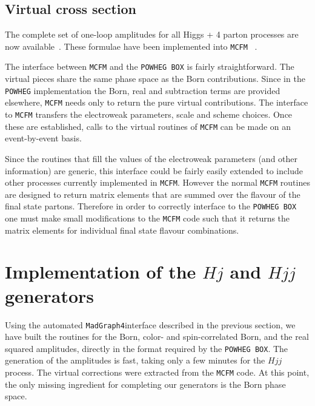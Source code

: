 \documentclass[paper]{JHEP3}
\newcommand\POWHEG{{\tt POWHEG}}
\newcommand\POWHEGBOX{{\tt POWHEG BOX}}
\newcommand\MG{{\tt MadGraph4}}
\newcommand\MCFM{{\tt MCFM}}
\begin{document}
\subsection{Virtual cross section}
The complete set of one-loop amplitudes for all Higgs + 4 parton processes
are now available~\cite{Berger:2006sh, Badger:2006us, Badger:2007si,Glover:2008ffa, Badger:2009hw, Dixon:2009uk, Badger:2009vh}. 
These formulae have been implemented into \MCFM{} ~\cite{Campbell:2010cz}. 
  
The interface between \MCFM{} and the \POWHEGBOX{} is fairly straightforward.
The virtual pieces share the same phase space as the Born
contributions. Since in the \POWHEG{} implementation the Born, real and
subtraction terms are provided elsewhere, \MCFM{} needs only to return the
pure virtual contributions.  The interface to \MCFM{} transfers the
electroweak parameters, scale and scheme choices.  Once these are
established, calls to the virtual routines of \MCFM{} can be made on an
event-by-event basis.
  
Since the routines that fill the values of the electroweak parameters (and
other information) are generic, this interface could be fairly easily
extended to include other processes currently implemented in \MCFM. However
the normal \MCFM{} routines are designed to return matrix elements that are
summed over the flavour of the final state partons. Therefore in order to
correctly interface to the \POWHEGBOX{} one must make small modifications to
the \MCFM{} code such that it returns the matrix elements for individual
final state flavour combinations.


\section{Implementation of the $Hj$ and $Hjj$ generators}
Using the automated \MG interface described in the previous section,
we have built the routines for the Born, color- and spin-correlated Born,
and the real squared amplitudes, directly in the format required by the
\POWHEGBOX{}. The generation of the amplitudes is fast, taking only a few
minutes for the $Hjj$ process. The virtual corrections were extracted from
the \MCFM{} code. At this point, the only missing ingredient for completing
our generators is the Born phase space.
\end{document}
